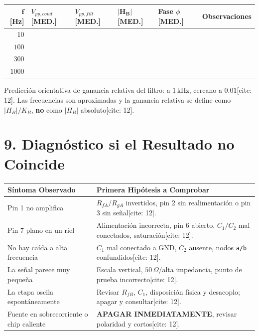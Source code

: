 \documentclass[11pt, a4paper]{article}
\begin{document}
\begin{center}
\begin{tabularx}{\textwidth}{@{} r L L L L L @{}}
\toprule
$\bm{f}$ \textbf{[Hz]} & \textbf{$V_{pp,cond}$ [MED.]} & \textbf{$V_{pp,filt}$ [MED.]} & $\mathbf{|H_B|}$ \textbf{[MED.]} & \textbf{Fase $\phi$ [MED.]} & \textbf{Observaciones} \\ \midrule
$10$ & & & & & \\ \addlinespace[8pt]
$100$ & & & & & \\ \addlinespace[8pt]
$300$ & & & & & \\ \addlinespace[8pt]
$1000$ & & & & & \\ \bottomrule
\end{tabularx}
\end{center}

Predicción orientativa de ganancia relativa del filtro: a $1\,\text{kHz}$, cercano a $0.01$[cite: 12]. Las frecuencias son aproximadas y la ganancia relativa se define como $|H_B|/K_B$, \textbf{no} como $|H_B|$ absoluto[cite: 12].

\section{9. Diagnóstico si el Resultado no Coincide}
\begin{center}
\begin{tabularx}{\textwidth}{@{} L L @{}}
\toprule
\textbf{Síntoma Observado} & \textbf{Primera Hipótesis a Comprobar} \\ \midrule
Pin 1 no amplifica & $R_{fA}/R_{gA}$ invertidos, pin 2 sin realimentación o pin 3 sin señal[cite: 12]. \\ \addlinespace[4pt]
Pin 7 plano en un riel & Alimentación incorrecta, pin 6 abierto, $C_1/C_2$ mal conectados, saturación[cite: 12]. \\ \addlinespace[4pt]
No hay caída a alta frecuencia & $C_1$ mal conectado a GND, $C_2$ ausente, nodos \texttt{a/b} confundidos[cite: 12]. \\ \addlinespace[4pt]
La señal parece muy pequeña & Escala vertical, $50\,\Omega$/alta impedancia, punto de prueba incorrecto[cite: 12]. \\ \addlinespace[4pt]
La etapa oscila espontáneamente & Revisar $R_{fB}$, $C_1$, disposición física y desacoplo; apagar y consultar[cite: 12]. \\ \addlinespace[4pt]
Fuente en sobrecorriente o chip caliente & \textbf{APAGAR INMEDIATAMENTE}, revisar polaridad y cortos[cite: 12]. \\ \bottomrule
\end{tabularx}
\end{center}
\end{document}

